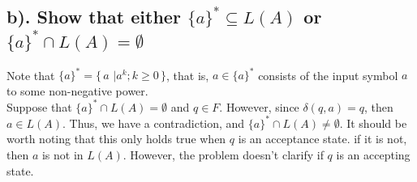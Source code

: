 \documentclass[20pt]{article} %
\begin{document}
\subsection{b). Show that either $\{a\}^{*} \subseteq L(A)$ or $\{a\}^{*} \cap L(A) = \emptyset$ }

Note that $\{a\}^{*} = \{\, a  \,\, \lvert a^{k} ;  k \geq 0\,\}$, that is, $a \in \{a\}^{*}$ consists of the input symbol $a$ to some non-negative power. \\

Suppose that $\{a\}^{*} \cap L(A) = \emptyset$ and $q \in F$.  However, since $\delta(q,a)=q$, then $a \in L(A)$.  Thus, we have a contradiction, and $\{a\}^{*} \cap L(A) \neq \emptyset$. It should be worth noting that this only holds true when $q$ is an acceptance state. if it is not, then $a$ is not in $L(A)$.  However, the problem doesn't clarify if $q$ is an accepting state.
\end{document}
